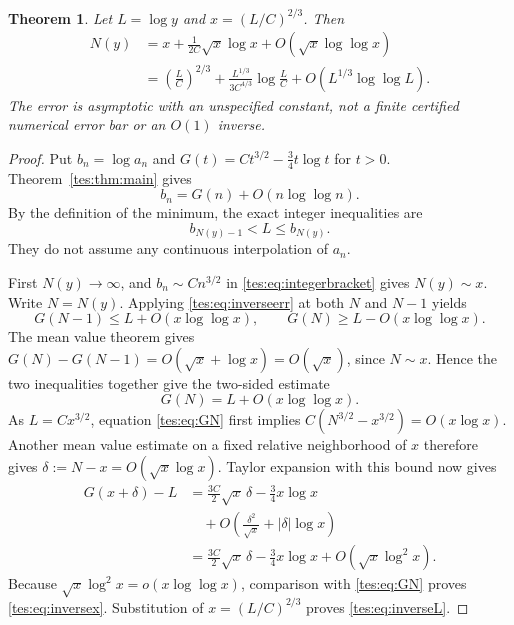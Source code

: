 \documentclass[11pt,a4paper]{article}
\newtheorem{theorem}{Theorem}[section]
\theoremstyle{remark}\newtheorem{remark}[theorem]{Remark}
\numberwithin{equation}{section}
\begin{document}
\begin{theorem}\label{tes:thm:inverse}
Let $L=\log y$ and $x=(L/C)^{2/3}$. Then
\begin{align}
N(y)&=x+\frac1{2C}\sqrt x\log x
+O(\sqrt x\log\log x)\label{tes:eq:inversex}\\
&=\left(\frac LC\right)^{2/3}
+\frac{L^{1/3}}{3C^{4/3}}\log\frac LC
+O(L^{1/3}\log\log L).\label{tes:eq:inverseL}
\end{align}
The error is asymptotic with an unspecified constant, not a finite certified numerical error bar or an $O(1)$ inverse.
\end{theorem}
\begin{proof}
Put $b_n=\log a_n$ and $G(t)=Ct^{3/2}-\tfrac34t\log t$ for $t>0$. Theorem~\ref{tes:thm:main} gives
\begin{equation}\label{tes:eq:inverseerr}
b_n=G(n)+O(n\log\log n).
\end{equation}
By the definition of the minimum, the exact integer inequalities are
\begin{equation}\label{tes:eq:integerbracket}
b_{N(y)-1}<L\le b_{N(y)}.
\end{equation}
They do not assume any continuous interpolation of $a_n$.

First $N(y)\to\infty$, and $b_n\sim Cn^{3/2}$ in \eqref{tes:eq:integerbracket} gives $N(y)\sim x$. Write $N=N(y)$. Applying \eqref{tes:eq:inverseerr} at both $N$ and $N-1$ yields
\[
G(N-1)\le L+O(x\log\log x),\qquad
G(N)\ge L-O(x\log\log x).
\]
The mean value theorem gives
$G(N)-G(N-1)=O(\sqrt x+\log x)=O(\sqrt x)$, since $N\sim x$. Hence the two inequalities together give the two-sided estimate
\begin{equation}\label{tes:eq:GN}
G(N)=L+O(x\log\log x).
\end{equation}
As $L=Cx^{3/2}$, equation \eqref{tes:eq:GN} first implies
$C(N^{3/2}-x^{3/2})=O(x\log x)$. Another mean value estimate on a fixed relative neighborhood of $x$ therefore gives
$\delta:=N-x=O(\sqrt x\log x)$.
Taylor expansion with this bound now gives
\begin{align*}
G(x+\delta)-L
&=\frac{3C}{2}\sqrt x\,\delta-\frac34x\log x\\
&\quad+O\left(\frac{\delta^2}{\sqrt x}+|\delta|\log x\right)\\
&=\frac{3C}{2}\sqrt x\,\delta-\frac34x\log x
+O(\sqrt x\log^2x).
\end{align*}
Because $\sqrt x\log^2x=o(x\log\log x)$, comparison with \eqref{tes:eq:GN} proves \eqref{tes:eq:inversex}. Substitution of $x=(L/C)^{2/3}$ proves \eqref{tes:eq:inverseL}.


\end{proof}
\end{document}
